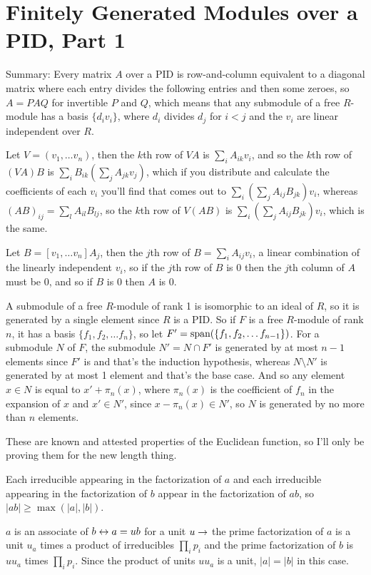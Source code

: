 \documentclass[11pt, oneside]{article}   	%
\begin{document}
\section{Finitely Generated Modules over a PID, Part 1}
Summary: Every matrix $A$ over a PID is row-and-column equivalent to a diagonal matrix where each entry divides the following entries and then some zeroes, so $A = PAQ$ for invertible $P$ and $Q$, which means that any submodule of a free $R$-module has a basis $\{d_iv_i\}$, where $d_i$ divides $d_j$ for $i < j$ and the $v_i$ are linear independent over $R$.
\be
\item \be
\item Let $V = (v_1, \ldots v_n)$, then the $k$th row of $VA$ is $\sum_i A_{ik}v_i$, and so the $k$th row of $(VA)B$ is $\sum_iB_{ik}(\sum_j A_{jk}v_j)$, which if you distribute and calculate the coefficients of each $v_i$ you'll find that comes out to $\sum_i(\sum_jA_{ij}B_{jk})v_i$, whereas $(AB)_{ij} = \sum_lA_{il}B_{lj}$, so the $k$th row of $V(AB)$ is $\sum_i(\sum_jA_{ij}B_{jk})v_i$, which is the same.
\item Let $B = [v_1, \ldots v_n]A_j$, then the $j$th row of $B = \sum_i A_{ij}v_i$, a linear combination of the linearly independent $v_i$, so if the $j$th row of $B$ is 0 then the $j$th column of $A$ must be 0, and so if $B$ is 0 then $A$ is 0.
\ee
\item A submodule of a free $R$-module of rank 1 is isomorphic to an ideal of $R$, so it is generated by a single element since $R$ is a PID. So if $F$ is a free $R$-module of rank $n$, it has a basis $\{f_1, f_2, \ldots f_n\}$, so let $F' = \text{span}(\{f_1, f_2, \ldots f_{n-1}\})$. For a submodule $N$ of $F$, the submodule $N' = N \cap F'$ is generated by at most $n-1$ elements since $F'$ is and that's the induction hypothesis, whereas $N \setminus N'$ is generated by at most 1 element and that's the base case. And so any element $x \in N$ is equal to $x' + \pi_n(x)$, where $\pi_n(x)$ is the coefficient of $f_n$ in the expansion of $x$ and $x' \in N'$, since $x - \pi_n(x) \in N'$, so $N$ is generated by no more than $n$ elements.
\item These are known and attested properties of the Euclidean function, so I'll only be proving them for the new length thing.
\be
\item Each irreducible appearing in the factorization of $a$ and each irreducible appearing in the factorization of $b$ appear in the factorization of $ab$, so $|ab| \ge \max(|a|, |b|)$.
\item $a$ is an associate of $b \leftrightarrow a = ub$ for a unit $u \rightarrow$ the prime factorization of $a$ is a unit $u_a$ times a product of irreducibles $\prod_ip_i$ and the prime factorization of $b$ is $uu_a$ times $\prod_ip_i$. Since the product of units $uu_a$ is a unit, $|a| = |b|$ in this case.
\end{document}
